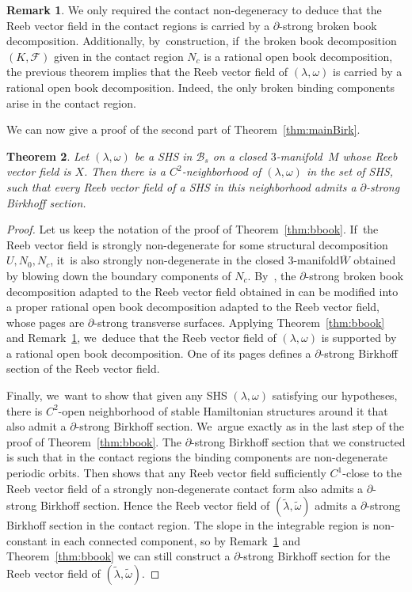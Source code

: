 \documentclass[11pt]{article}
\newcommand{\threemanifold}{$3$\nobreakdash-mani\-fold\xspace}
\newtheorem{theorem}{Theorem}[section]
\theoremstyle{definition}
\newtheorem{Remark}[theorem]{Remark}
\begin{document}
\begin{Remark} \label{rem:bbook}
We only required the contact non-degeneracy to deduce that the Reeb vector field in the contact regions is carried by a $\partial$-strong broken book decomposition. Additionally, by~construction, if~the broken book decomposition $(K,\mathcal{F})$ given in the contact region $N_c$ is a rational open book decomposition, the previous theorem implies that the Reeb vector field of $(\lambda,\omega)$ is carried by a rational open book decomposition. Indeed, the only broken binding components arise in the contact region.
\end{Remark}

We can now give a proof of the second part of Theorem~\ref{thm:mainBirk}.

\begin{theorem}\label{thm:Bsection}
Let $(\lambda,\omega)$ be a SHS in $\mathcal{B}_s$ on a closed \threemanifold~$M$ whose Reeb vector field is $X$.
Then there is a $C^2$-neighborhood of $(\lambda,\omega)$ in the set of SHS, such that every Reeb vector field of a SHS in this neighborhood admits a $\partial$-strong Birkhoff section.
\end{theorem}

\begin{proof}
Let us keep the notation of the proof of Theorem~\ref{thm:bbook}. If~the Reeb vector field is strongly non-degenerate for some structural decomposition $U, N_0, N_c$, it~is also strongly non-degenerate in the closed \threemanifold $\overline W$ obtained by blowing down the boundary components of $N_c$. By~\cite[Th.\,A]{CM}, the $\partial$-strong broken book decomposition adapted to the Reeb vector field obtained in \cite[Th.\,1.1]{CDR} can be modified into a proper rational open book decomposition adapted to the Reeb vector field, whose pages are $\partial$-strong transverse surfaces. Applying Theorem~\ref{thm:bbook} and Remark~\ref{rem:bbook}, we~deduce that the Reeb vector field of $(\lambda,\omega)$ is supported by a rational open book decomposition. One of its pages defines a $\partial$-strong Birkhoff section of the Reeb vector field.

Finally, we~want to show that given any SHS $(\lambda,\omega)$ satisfying our hypotheses, there is $C^2$-open neighborhood of stable Hamiltonian structures around it that also admit a $\partial$-strong Birkhoff section. We~argue exactly as in the last step of the proof of Theorem~\ref{thm:bbook}. The $\partial$-strong Birkhoff section that we constructed is such that in the contact regions the binding components are non-degenerate periodic orbits. Then \cite[Prop.\,5.1]{CDHR} shows that any Reeb vector field sufficiently $C^1$-close to the Reeb vector field of a strongly non-degenerate contact form also admits a $\partial$-strong Birkhoff section. Hence the Reeb vector field of
$(\widetilde \lambda, \widetilde \omega)$ admits a $\partial$-strong Birkhoff section in the contact region. The slope in the integrable region is non-constant in each connected component, so by Remark~\ref{rem:bbook} and Theorem~\ref{thm:bbook} we can still construct a $\partial$-strong Birkhoff section for the Reeb vector field of $(\widetilde \lambda, \widetilde \omega)$.
\end{proof}
\end{document}
